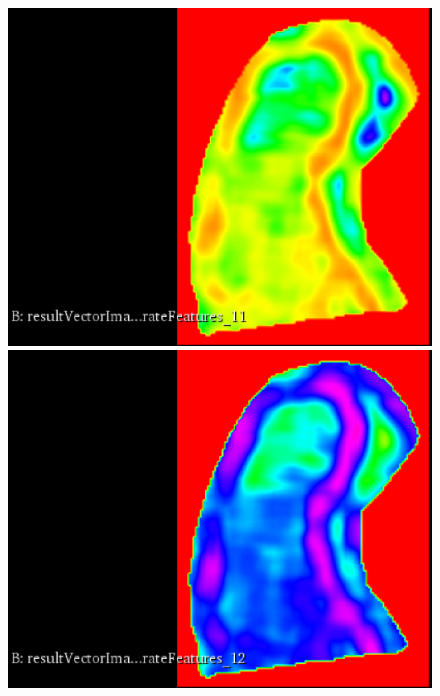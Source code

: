 \documentclass{InsightArticle}
\begin{document}
\begin{figure}[H]
  \begin{center}
    \includegraphics[scale=0.3]{figures/Energy.eps}
    \includegraphics[scale=0.3]{figures/Entropy.eps}

\end{center}
\end{figure}
\end{document}
